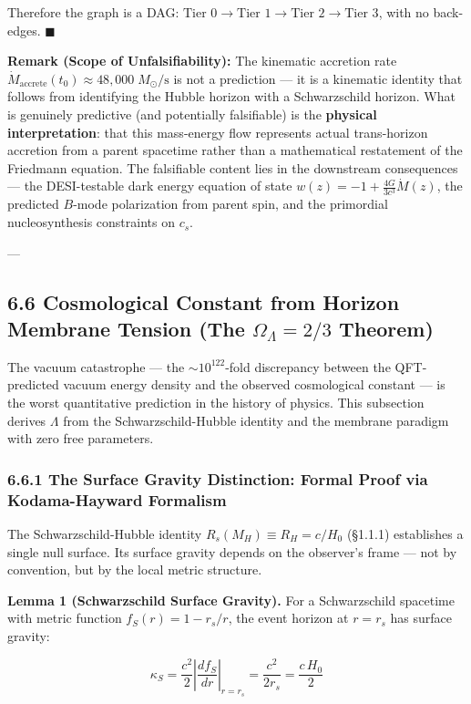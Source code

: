 \documentclass[11pt,a4paper]{article}
\theoremstyle{definition}
\theoremstyle{remark}
\begin{document}
Therefore the graph is a DAG: $\text{Tier 0} \to \text{Tier 1} \to \text{Tier 2} \to \text{Tier 3}$, with no back-edges. $\blacksquare$

\textbf{Remark (Scope of Unfalsifiability):} The kinematic accretion rate $\dot{M}_{\text{accrete}}(t_0) \approx 48{,}000 \; M_\odot/\text{s}$ is not a prediction — it is a kinematic identity that follows from identifying the Hubble horizon with a Schwarzschild horizon. What is genuinely predictive (and potentially falsifiable) is the \textbf{physical interpretation}: that this mass-energy flow represents actual trans-horizon accretion from a parent spacetime rather than a mathematical restatement of the Friedmann equation. The falsifiable content lies in the downstream consequences — the DESI-testable dark energy equation of state $w(z) = -1 + \frac{4G}{3c^3}\dot{M}(z)$, the predicted $B$-mode polarization from parent spin, and the primordial nucleosynthesis constraints on $c_s$.

---

\subsection{6.6 Cosmological Constant from Horizon Membrane Tension (The $\Omega_\Lambda = 2/3$ Theorem)}

The vacuum catastrophe — the $\sim 10^{122}$-fold discrepancy between the QFT-predicted vacuum energy density and the observed cosmological constant — is the worst quantitative prediction in the history of physics. This subsection derives $\Lambda$ from the Schwarzschild-Hubble identity and the membrane paradigm with zero free parameters.

\subsubsection{6.6.1 The Surface Gravity Distinction: Formal Proof via Kodama-Hayward Formalism}

The Schwarzschild-Hubble identity $R_s(M_H) \equiv R_H = c/H_0$ (\S 1.1.1) establishes a single null surface. Its surface gravity depends on the observer's frame — not by convention, but by the local metric structure.

\textbf{Lemma 1 (Schwarzschild Surface Gravity).} For a Schwarzschild spacetime with metric function $f_S(r) = 1 - r_s/r$, the event horizon at $r = r_s$ has surface gravity:


\begin{equation}
\kappa_S = \frac{c^2}{2} \left|\frac{df_S}{dr}\right|_{r=r_s} = \frac{c^2}{2 r_s} = \frac{c \, H_0}{2}
\end{equation}
\end{document}

